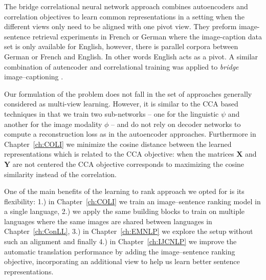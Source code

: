 The bridge correlational neural network approach \citep{rajendran2015bridge}
combines autoencoders and correlation objectives to 
learn common representations in a setting when the different views only need to be
aligned with one pivot view. They preform
image-sentence retrieval experiments in French or German where
the image-caption data set is only available for English, however,
there is parallel corpora between German or French and English. In other words English acts as a pivot.
A similar combination of autencoder and correlational training was applied to \emph{bridge}
image--captioning \citep{saha2016correlational}.

Our formulation of the problem does not fall in the set of approaches generally 
considered as multi-view learning.  However, it is similar to the CCA based techniques in that we
train two sub-networks -- one for the linguistic $\psi$ and another for the image modality $\phi$ --
and do not rely on decoder networks to compute a reconstruction  loss as in the autoencoder approaches.
Furthermore in Chapter~\ref{ch:COLI} we minimize the cosine distance between the learned representations
which is related to the CCA objective: when the matrices $\mathbf{X}$ and  $\mathbf{Y}$ are not centered
the CCA objective corresponds to maximizing the cosine similarity instead of the correlation.

One of the main benefits of the learning to rank approach we opted for is
its flexibility: 1.) in Chapter~\ref{ch:COLI} we train an image--sentence ranking model in a single 
language, 2.) we apply the same building blocks to train on multiple languages where 
the same images are shared between languages in Chapter~\ref{ch:ConLL}, 3.) in 
Chapter~\ref{ch:EMNLP} we explore the setup without such an alignment and finally 4.) 
in Chapter~\ref{ch:IJCNLP} we improve the automatic translation  performance 
by adding the image--sentence ranking objective, incorporating an additional view 
to help us learn better sentence representations. 

